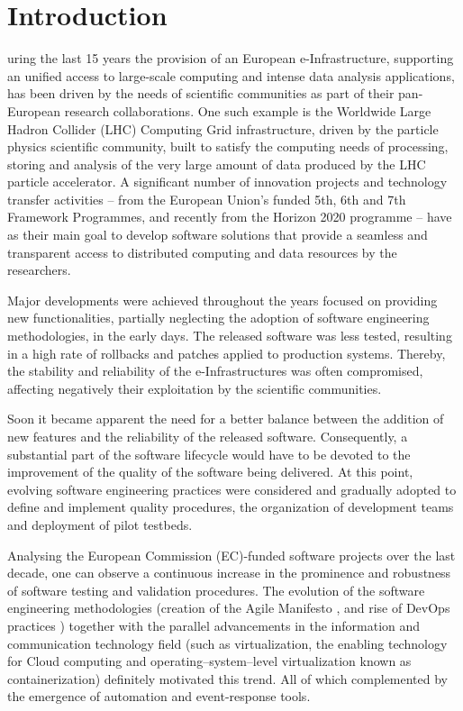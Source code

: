 \documentclass[journal]{IEEEtran}
\begin{document}
\IEEEpeerreviewmaketitle

\section{Introduction}

uring the last 15 years the provision of an European e-Infrastructure,
supporting an unified access to large-scale computing and intense data analysis
applications, has been driven by the needs of scientific communities as part of their
pan-European research collaborations. One such example is the Worldwide
Large Hadron Collider (LHC) Computing Grid infrastructure, driven
by the particle physics scientific community, built to satisfy the computing needs
of processing, storing and analysis of the very large amount of data produced by the
LHC particle accelerator. A significant number of innovation projects and
technology transfer activities -- from the European Union's funded 5th, 6th and 7th Framework Programmes,
and recently from the Horizon 2020 programme \cite{h2020} -- have as their main goal to
develop software solutions that provide a seamless and transparent access to distributed
computing and data resources by the researchers.

Major developments were achieved throughout the years focused on providing new
functionalities, partially neglecting the adoption of software engineering methodologies, in the early days.
The released software was less tested, resulting in a high rate of
rollbacks and patches applied to production systems. Thereby, the stability and
reliability of the e-Infrastructures was often compromised, affecting
negatively their exploitation by the scientific communities.

Soon it became apparent the need for a better balance between the addition of new features
and the reliability of the released software. Consequently, a substantial part of the
software lifecycle would have to be devoted to the improvement of the quality of the software being
delivered. At this point, evolving software engineering practices were
considered and gradually adopted to define and implement quality procedures, the organization of development teams
and deployment of pilot testbeds.

Analysing the European Commission (EC)-funded software projects over the last decade,
one can observe a continuous increase in the prominence and robustness of software
testing and validation procedures. The
evolution of the software engineering methodologies (creation of the Agile
Manifesto \cite{agile-manifesto}, and rise of DevOps practices \cite{zhu}) together
with the parallel advancements in the information and communication technology
field (such as virtualization, the enabling technology for Cloud computing and
operating--system--level virtualization known as containerization) definitely motivated this trend. All of which
complemented by the emergence of automation and event-response tools.
\end{document}
